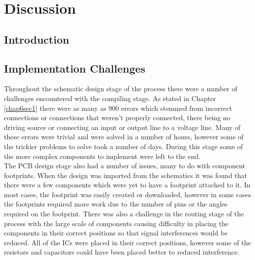 
\chapter{Discussion} %

\label{Chapter7} %


\section{Introduction}

\section{Implementation Challenges}

	Throughout the schematic design stage of the process there were a number of challenges encountered with the compiling stage. 
As stated in Chapter \ref{chap6sec1} there were as many as 900 errors which stemmed from incorrect connections or connections that weren't properly connected, there being no driving source or connecting an input or output line to a voltage line. 
Many of these errors were trivial and were solved in a number of hours, however some of the trickier problems to solve took a number of days. 
During this stage some of the more complex components to implement were left to the end.\\

	The PCB design stage also had a number of issues, many to do with component footprints. 
When the design was imported from the schematics it was found that there were a few components which were yet to have a footprint attached to it. 
In most cases, the footprint was easily created or downloaded, however in some cases the footprints required more work due to the number of pins or the angles required on the footprint. 
There was also a challenge in the routing stage of the process with the large scale of components causing difficulty in placing the components in their correct positions so that signal interferences would be reduced. 
All of the ICs were placed in their correct positions, however some of the resistors and capacitors could have been placed better to reduced interference. \\


